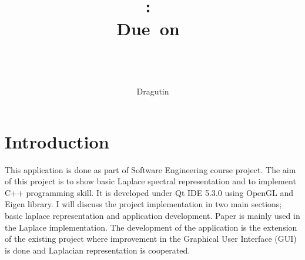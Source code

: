 \documentclass{article}
\title{
\vspace{2in}
\textmd{\textbf{\hmwkClass:\ \hmwkTitle}}\\
\normalsize\vspace{0.1in}\small{Due\ on\ \hmwkDueDate}\\
\vspace{0.1in}\large{\textit{\hmwkClassInstructor\ \hmwkClassTime}}
\vspace{3in}
}
\author{\textbf{\hmwkAuthorName} \\ Dragutin}
\begin{document}
\maketitle


\newpage
\tableofcontents
\clearpage

\newpage
\section{Introduction}
  This application is done as part of Software Engineering course project.  The aim of this project is to show basic Laplace spectral representation and to implement C++ programming skill.
 It is developed under Qt IDE 5.3.0 using OpenGL and Eigen library. I will discuss the project implementation in two main sections; basic laplace representation and application development. Paper \cite{laplacemesh} is mainly used in the Laplace implementation. The development of the application is the extension of the existing project where improvement in the Graphical User Interface (GUI) is done and Laplacian representation is cooperated. 
 
\end{document}

